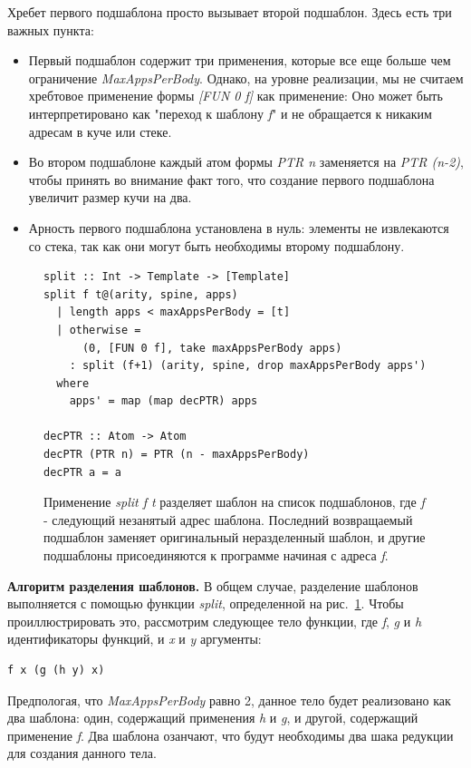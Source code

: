\documentclass[flenqn, 14pt]{extarticle}
\begin{document}
Хребет первого подшаблона просто вызывает второй подшаблон. Здесь есть три важных пункта:
\begin{itemize}
\item Первый подшаблон содержит три применения, которые все еще больше чем ограничение \textit{MaxAppsPerBody}. Однако, на уровне реализации, мы не считаем хребтовое применение формы \textit{[FUN 0 f]} как применение: Оно может быть интерпретировано как "переход к шаблону \textit{f}" и не обращается к никаким адресам в куче или стеке.
\item Во втором подшаблоне каждый атом формы \textit{PTR n} заменяется на \textit{PTR (n-2)}, чтобы принять во внимание факт того, что создание первого подшаблона увеличит размер кучи на два.
\item Арность первого подшаблона установлена в нуль: элементы не извлекаются со стека, так как они могут быть необходимы второму подшаблону.
\end{itemize}

\begin{figure}[t]
\centering
\begin{verbatim}
split :: Int -> Template -> [Template]
split f t@(arity, spine, apps)
  | length apps < maxAppsPerBody = [t]
  | otherwise =
      (0, [FUN 0 f], take maxAppsPerBody apps)
    : split (f+1) (arity, spine, drop maxAppsPerBody apps')
  where
    apps' = map (map decPTR) apps

decPTR :: Atom -> Atom
decPTR (PTR n) = PTR (n - maxAppsPerBody)
decPTR a = a
\end{verbatim}
\caption{Применение \textit{split f t} разделяет шаблон на список подшаблонов, где \textit{f} - следующий незанятый адрес шаблона. Последний возвращаемый подшаблон заменяет оригинальный неразделенный шаблон, и другие подшаблоны присоединяются к программе начиная с адреса \textit{f}.}
\label{fig:tempale_split_func}
\end{figure}

\textbf{Алгоритм разделения шаблонов.} В общем случае, разделение шаблонов выполняется с помощью функции \textit{split}, определенной на рис.~\ref{fig:tempale_split_func}. Чтобы проиллюстрировать это, рассмотрим следующее тело функции, где \textit{f}, \textit{g} и \textit{h} идентификаторы функций, и \textit{x} и \textit{y} аргументы:
\begin{verbatim}
f x (g (h y) x)
\end{verbatim}

Предпологая, что \textit{MaxAppsPerBody} равно 2, данное тело будет реализовано как два шаблона: один, содержащий применения \textit{h} и \textit{g}, и другой, содержащий применение \textit{f}. Два шаблона озанчают, что будут необходимы два шака редукции для создания данного тела.
\end{document}
